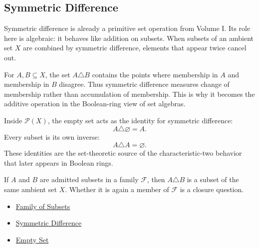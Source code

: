 \subsection{Symmetric Difference}

\begin{remark*}[Exposition]
Symmetric difference is already a primitive set operation from Volume I.  Its
role here is algebraic: it behaves like addition on subsets.  When subsets of
an ambient set \(X\) are combined by symmetric difference, elements that appear
twice cancel out.
\end{remark*}

\begin{remark*}[Interpretation]
For \(A,B\subseteq X\), the set \(A\triangle B\) contains the points where
membership in \(A\) and membership in \(B\) disagree.  Thus symmetric
difference measures change of membership rather than accumulation of
membership.  This is why it becomes the additive operation in the Boolean-ring
view of set algebras.
\end{remark*}

\begin{remark*}
Inside \(\mathcal{P}(X)\), the empty set acts as the identity for symmetric
difference:
\[
  A\triangle\varnothing=A.
\]
Every subset is its own inverse:
\[
  A\triangle A=\varnothing.
\]
These identities are the set-theoretic source of the characteristic-two
behavior that later appears in Boolean rings.
\end{remark*}

\begin{remark*}[Examples]
If \(A\) and \(B\) are admitted subsets in a family \(\mathcal{F}\), then
\(A\triangle B\) is a subset of the same ambient set \(X\).  Whether it is
again a member of \(\mathcal{F}\) is a closure question.
\end{remark*}

\begin{dependencies}
\begin{itemize}
  \item \hyperref[def:family-of-subsets]{Family of Subsets}
  \item \hyperref[def:sym-diff]{Symmetric Difference}
  \item \hyperref[def:empty-set]{Empty Set}
\end{itemize}
\end{dependencies}
